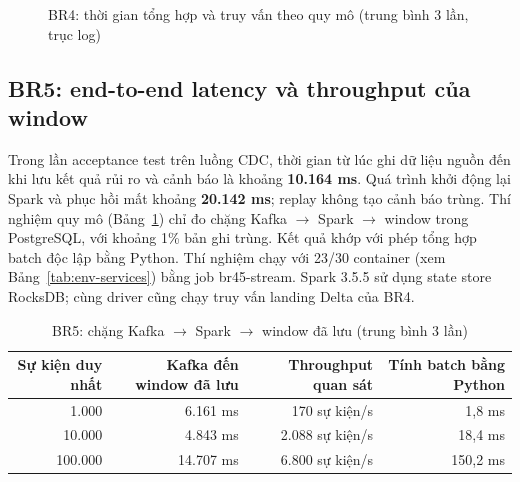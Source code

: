 \begin{figure}[H]
\centering
{}
\caption{BR4: thời gian tổng hợp và truy vấn theo quy mô (trung bình 3 lần, trục log)}
\label{fig:br4}
\end{figure}

\subsection{BR5: end-to-end latency và throughput của window}

Trong lần acceptance test trên luồng CDC, thời gian từ lúc ghi dữ liệu nguồn đến khi lưu kết quả rủi ro và cảnh báo là khoảng \textbf{10.164 ms}. Quá trình khởi động lại Spark và phục hồi mất khoảng \textbf{20.142 ms}; replay không tạo cảnh báo trùng. Thí nghiệm quy mô (Bảng~\ref{tab:br5}) chỉ đo chặng Kafka $\rightarrow$ Spark $\rightarrow$ window trong PostgreSQL, với khoảng 1\% bản ghi trùng. Kết quả khớp với phép tổng hợp batch độc lập bằng Python. Thí nghiệm chạy với 23/30 container (xem Bảng~\ref{tab:env-services}) bằng job br45-stream. Spark 3.5.5 sử dụng state store RocksDB; cùng driver cũng chạy truy vấn landing Delta của BR4.

\begin{table}[H]
\centering\small
\caption{BR5: chặng Kafka $\rightarrow$ Spark $\rightarrow$ window đã lưu (trung bình 3 lần)}\label{tab:br5}
\begin{tabular}{@{}rrrr@{}}
\toprule
\textbf{Sự kiện duy nhất} & \textbf{Kafka đến window đã lưu} & \textbf{Throughput quan sát} & \textbf{Tính batch bằng Python} \\
\midrule
1.000 & 6.161 ms & 170 sự kiện/s & 1,8 ms \\
10.000 & 4.843 ms & 2.088 sự kiện/s & 18,4 ms \\
100.000 & 14.707 ms & 6.800 sự kiện/s & 150,2 ms \\
\bottomrule
\end{tabular}
\end{table}

